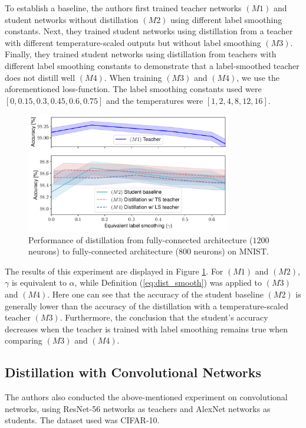To establish a baseline, the authors first trained teacher networks $(M1)$ and student networks without distillation $(M2)$ using different label smoothing constants. Next, they trained student networks using distillation from a teacher with different temperature-scaled outputs but without label smoothing $(M3)$. Finally, they trained student networks using distillation from teachers with different label smoothing constants to demonstrate that a label-smoothed teacher does not distill well $(M4)$. When training $(M3)$ and $(M4)$, we use the aforementioned loss-function. The label smoothing constants used were $[0,0.15,0.3,0.45,0.6,0.75]$ and the temperatures were $[1, 2, 4, 8, 12, 16]$.
\begin{figure}[ht]
\centering
\includegraphics[width=0.8\textwidth]{figures/fc_knowledge_distillation.pdf}
\caption{Performance of distillation from fully-connected architecture ($1200$ neurons) to fully-connected architecture ($800$ neurons) on MNIST.}
\label{fig:fc_dist}
\end{figure}

The results of this experiment are displayed in Figure \ref{fig:fc_dist}. For $(M1)$ and $(M2)$, $\gamma$ is equivalent to $\alpha$, while Definition (\ref{eq:dist_smooth}) was applied to $(M3)$ and $(M4)$. Here one can see that the accuracy of the student baseline $(M2)$ is generally lower than the accuracy of the distillation with a temperature-scaled teacher $(M3)$. Furthermore, the conclusion that the student's accuracy decreases when the teacher is trained with label smoothing remains true when comparing $(M3)$ and $(M4)$.

\subsection{Distillation with Convolutional Networks}
The authors also conducted the above-mentioned experiment on convolutional networks, using ResNet-56 networks as teachers and AlexNet networks as students. The dataset used was CIFAR-10.

